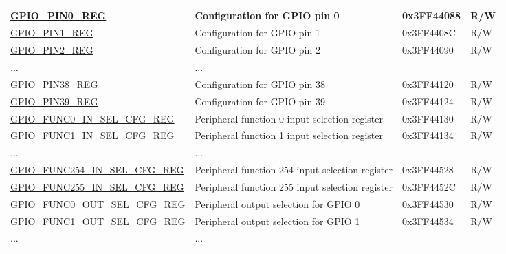\begin{longtable}{ | p{5.6cm} | p{7.4cm} | p{2cm} | p{1cm} | }
\hyperref[regdesc:GPIOPINnREG]{GPIO\_PIN0\_REG} & Configuration for GPIO pin 0 & 0x3FF44088 & R/W \\ \hline
\hyperref[regdesc:GPIOPINnREG]{GPIO\_PIN1\_REG} & Configuration for GPIO pin 1 & 0x3FF4408C & R/W\\ \hline
\hyperref[regdesc:GPIOPINnREG]{GPIO\_PIN2\_REG} & Configuration for GPIO pin 2 & 0x3FF44090 & R/W \\ \hline
... & ... & & \\ \hline
\hyperref[regdesc:GPIOPINnREG]{GPIO\_PIN38\_REG} & Configuration for GPIO pin 38 & 0x3FF44120 & R/W \\ \hline
\hyperref[regdesc:GPIOPINnREG]{GPIO\_PIN39\_REG} & Configuration for GPIO pin 39 & 0x3FF44124 & R/W \\ \hline
\hyperref[regdesc:GPIOFUNCnINSELCFGREG]{GPIO\_FUNC0\_IN\_SEL\_CFG\_REG} & Peripheral function 0 input selection register & 0x3FF44130 &R/W \\ \hline
\hyperref[regdesc:GPIOFUNCnINSELCFGREG]{GPIO\_FUNC1\_IN\_SEL\_CFG\_REG} & Peripheral function 1 input selection register & 0x3FF44134 & R/W \\ \hline
... & ... & & \\ \hline
\hyperref[regdesc:GPIOFUNCnINSELCFGREG]{GPIO\_FUNC254\_IN\_SEL\_CFG\_REG} & Peripheral function 254 input selection register & 0x3FF44528 & R/W \\ \hline
\hyperref[regdesc:GPIOFUNCnINSELCFGREG]{GPIO\_FUNC255\_IN\_SEL\_CFG\_REG} & Peripheral function 255 input selection register & 0x3FF4452C & R/W \\ \hline
\hyperref[regdesc:GPIOFUNCnOUTSELCFGREG]{GPIO\_FUNC0\_OUT\_SEL\_CFG\_REG} & Peripheral output selection for GPIO 0 & 0x3FF44530 & R/W \\ \hline
\hyperref[regdesc:GPIOFUNCnOUTSELCFGREG]{GPIO\_FUNC1\_OUT\_SEL\_CFG\_REG} & Peripheral output selection for GPIO 1 & 0x3FF44534 & R/W \\ \hline
... & ... & & \\ \hline
\end{longtable}
